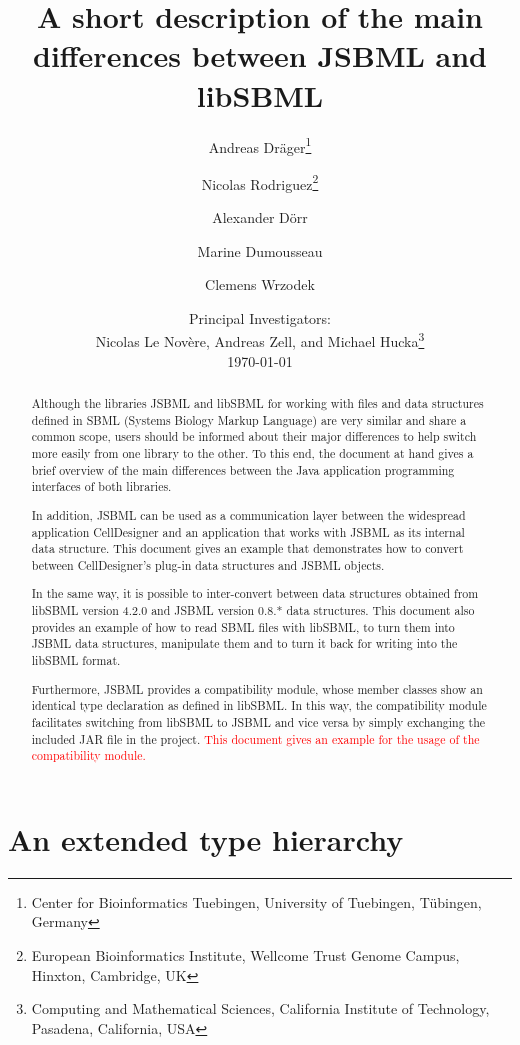 \documentclass[
  BCOR12mm,
  letterpaper,
  11pt,
  headsepline,
  pointlessnumbers,
  tablecaptionabove,
  onelinecaption,
  headinclude,
  appendixprefix,
  idxtotoc,
  bibtotoc,
  twoside,
  titlepage
]{scrartcl}
\title{A short description of the main differences between JSBML and libSBML}
\author{Andreas Dr\"ager\thanks{Center for Bioinformatics Tuebingen, University
of Tuebingen, T\"ubingen, Germany}\and%
Nicolas Rodriguez\thanks{European Bioinformatics Institute, Wellcome Trust
Genome Campus, Hinxton, Cambridge, UK}\and%
Alexander D\"orr\footnotemark[1]\and%
Marine Dumousseau\footnotemark[2]\and%
Clemens Wrzodek\footnotemark[1]}
\date{Principal Investigators:\\
Nicolas Le Nov{\`e}re\footnotemark[2], Andreas Zell\footnotemark[1], and Michael
Hucka\thanks{Computing and Mathematical Sciences, California Institute of
Technology, Pasadena, California, USA}\\[4ex]
\today}
\begin{document}
\maketitle
\tableofcontents

\begin{abstract}
Although the libraries JSBML and libSBML for working with files and data
structures defined in SBML (Systems Biology Markup Language) are
very similar and share a common scope, users should be informed about their
major differences to help switch more easily from one library to the other. To
this end, the document at hand gives a brief overview of the main differences
between the Java\texttrademark{} application programming interfaces of both
libraries.

In addition, JSBML can be used as a communication layer between the widespread
application CellDesigner and an application that works with JSBML as its
internal data structure. This document gives an example that demonstrates how to
convert between CellDesigner's plug-in data structures and JSBML objects.

In the same way, it is possible to inter-convert between data structures
obtained from libSBML version 4.2.0 and JSBML version 0.8.* data structures.
This document also provides an example of how to read SBML files with libSBML,
to turn them into JSBML data structures, manipulate them and to turn it back for
writing into the libSBML format.

Furthermore, JSBML provides a compatibility module, whose member classes show
an identical type declaration as defined in libSBML. In this way, the
compatibility module facilitates switching from libSBML to JSBML and vice versa
by simply exchanging the included JAR file in the project. \textcolor{red}{This
document gives an example for the usage of the compatibility module.}
\end{abstract}

\section{An extended type hierarchy}
\end{document}
